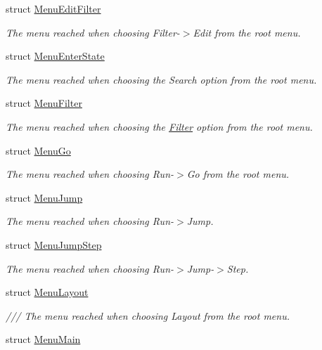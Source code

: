 \begin{DoxyCompactItemize}
struct \hyperlink{structslb_1_1core_1_1ui_1_1MenuEditFilter}{Menu\+Edit\+Filter}
\begin{DoxyCompactList}\small\item\em The menu reached when choosing Filter-\/$>$Edit from the root menu. \end{DoxyCompactList}\item 
struct \hyperlink{structslb_1_1core_1_1ui_1_1MenuEnterState}{Menu\+Enter\+State}
\begin{DoxyCompactList}\small\item\em The menu reached when choosing the Search option from the root menu. \end{DoxyCompactList}\item 
struct \hyperlink{structslb_1_1core_1_1ui_1_1MenuFilter}{Menu\+Filter}
\begin{DoxyCompactList}\small\item\em The menu reached when choosing the \hyperlink{structslb_1_1core_1_1ui_1_1Filter}{Filter} option from the root menu. \end{DoxyCompactList}\item 
struct \hyperlink{structslb_1_1core_1_1ui_1_1MenuGo}{Menu\+Go}
\begin{DoxyCompactList}\small\item\em The menu reached when choosing Run-\/$>$Go from the root menu. \end{DoxyCompactList}\item 
struct \hyperlink{structslb_1_1core_1_1ui_1_1MenuJump}{Menu\+Jump}
\begin{DoxyCompactList}\small\item\em The menu reached when choosing Run-\/$>$Jump. \end{DoxyCompactList}\item 
struct \hyperlink{structslb_1_1core_1_1ui_1_1MenuJumpStep}{Menu\+Jump\+Step}
\begin{DoxyCompactList}\small\item\em The menu reached when choosing Run-\/$>$Jump-\/$>$Step. \end{DoxyCompactList}\item 
struct \hyperlink{structslb_1_1core_1_1ui_1_1MenuLayout}{Menu\+Layout}
\begin{DoxyCompactList}\small\item\em /// The menu reached when choosing Layout from the root menu. \end{DoxyCompactList}\item 
struct \hyperlink{structslb_1_1core_1_1ui_1_1MenuMain}{Menu\+Main}

\end{DoxyCompactItemize}
